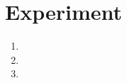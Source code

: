 \documentclass{article}
\begin{document}
\section{Experiment}

\begin{enumerate}[label=\alph*.,leftmargin=*]
    \item
    \item
    \item
\end{enumerate}



\end{document}
